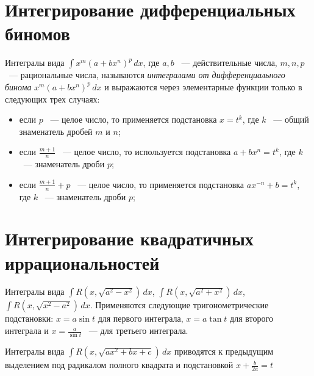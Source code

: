 \documentclass[11pt]{article}
\begin{document}
	\section{Интегрирование дифференциальных биномов}
	Интегралы вида $\int x^m (a + bx^n)^p\, dx$, где $a, b$ ~--- действительные числа, $m, n, p$ ~--- рациональные числа, называются \textit{интегралами от дифференциального бинома} $x^m (a + bx^n)^p\, dx$ и выражаются через элементарные функции только в следующих трех случаях:
	\begin{itemize}
		\item если $p$ ~--- целое число, то применяется подстановка $x = t^k$, где $k$ ~--- общий знаменатель дробей $m$ и $n$;
		\item если $\frac{m + 1}{n}$ ~--- целое число, то используется подстановка $a + bx^n = t^k$, где $k$ ~--- знаменатель дроби $p$;
		\item если $\frac{m + 1}{n} + p$ ~--- целое число, то применяется подстановка $ax^{-n} + b = t^k$, где $k$ ~--- знаменатель дроби $p$;
	\end{itemize}
	\section{Интегрирование квадратичных иррациональностей}
	Интегралы вида $\int R(x, \sqrt{a^2 - x^2})\, dx$, $\int R(x, \sqrt{a^2 + x^2})\, dx$, $\int R(x, \sqrt{x^2 - a^2})\, dx$. Применяются следующие тригонометрические подстановки: $x = a\sin t$ для первого интеграла, $x = a\tan t$ для второго интеграла и $x = \frac{a}{\sin t}$ ~--- для третьего интеграла.

	Интегралы вида $\int R(x, \sqrt{ax^2 + bx + c})\, dx$ приводятся к предыдущим выделением под радикалом полного квадрата и подстановкой $x + \frac{b}{2a} = t$
\end{document}
